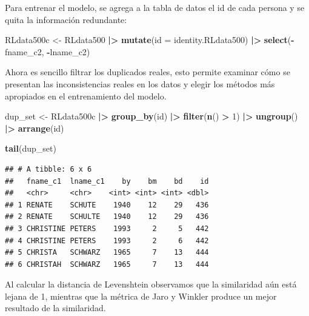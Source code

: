 \documentclass[
  12pt,
]{book}
\newenvironment{Shaded}{\begin{snugshade}}{\end{snugshade}}
\newcommand{\AttributeTok}[1]{\textcolor[rgb]{0.13,0.29,0.53}{#1}}
\newcommand{\DecValTok}[1]{\textcolor[rgb]{0.00,0.00,0.81}{#1}}
\newcommand{\FunctionTok}[1]{\textcolor[rgb]{0.13,0.29,0.53}{\textbf{#1}}}
\newcommand{\NormalTok}[1]{#1}
\newcommand{\OtherTok}[1]{\textcolor[rgb]{0.56,0.35,0.01}{#1}}
\newcommand{\SpecialCharTok}[1]{\textcolor[rgb]{0.81,0.36,0.00}{\textbf{#1}}}
\begin{document}
Para entrenar el modelo, se agrega a la tabla de datos el id de cada persona y se quita la información redundante:

\begin{Shaded}
\begin{Highlighting}[]
\NormalTok{RLdata500c }\OtherTok{\textless{}{-}}\NormalTok{ RLdata500 }\SpecialCharTok{|\textgreater{}}  
              \FunctionTok{mutate}\NormalTok{(}\AttributeTok{id =}\NormalTok{ identity.RLdata500) }\SpecialCharTok{|\textgreater{}} 
              \FunctionTok{select}\NormalTok{(}\SpecialCharTok{{-}}\NormalTok{fname\_c2, }\SpecialCharTok{{-}}\NormalTok{lname\_c2)}
\end{Highlighting}
\end{Shaded}

Ahora es sencillo filtrar los duplicados reales, esto permite examinar cómo se presentan las inconsistencias reales en los datos y elegir los métodos más apropiados en el entrenamiento del modelo.

\begin{Shaded}
\begin{Highlighting}[]
\NormalTok{dup\_set }\OtherTok{\textless{}{-}}\NormalTok{ RLdata500c }\SpecialCharTok{|\textgreater{}} 
           \FunctionTok{group\_by}\NormalTok{(id) }\SpecialCharTok{|\textgreater{}} 
           \FunctionTok{filter}\NormalTok{(}\FunctionTok{n}\NormalTok{() }\SpecialCharTok{\textgreater{}} \DecValTok{1}\NormalTok{) }\SpecialCharTok{|\textgreater{}}
           \FunctionTok{ungroup}\NormalTok{() }\SpecialCharTok{|\textgreater{}} 
           \FunctionTok{arrange}\NormalTok{(id)}

\FunctionTok{tail}\NormalTok{(dup\_set)}
\end{Highlighting}
\end{Shaded}

\begin{verbatim}
## # A tibble: 6 x 6
##   fname_c1  lname_c1    by    bm    bd    id
##   <chr>     <chr>    <int> <int> <int> <dbl>
## 1 RENATE    SCHUTE    1940    12    29   436
## 2 RENATE    SCHULTE   1940    12    29   436
## 3 CHRISTINE PETERS    1993     2     5   442
## 4 CHRISTINE PETERS    1993     2     6   442
## 5 CHRISTA   SCHWARZ   1965     7    13   444
## 6 CHRISTAH  SCHWARZ   1965     7    13   444
\end{verbatim}

Al calcular la distancia de Levenshtein observamos que la similaridad aún está lejana de 1, mientras que la métrica de Jaro y Winkler produce un mejor resultado de la similaridad.
\end{document}
